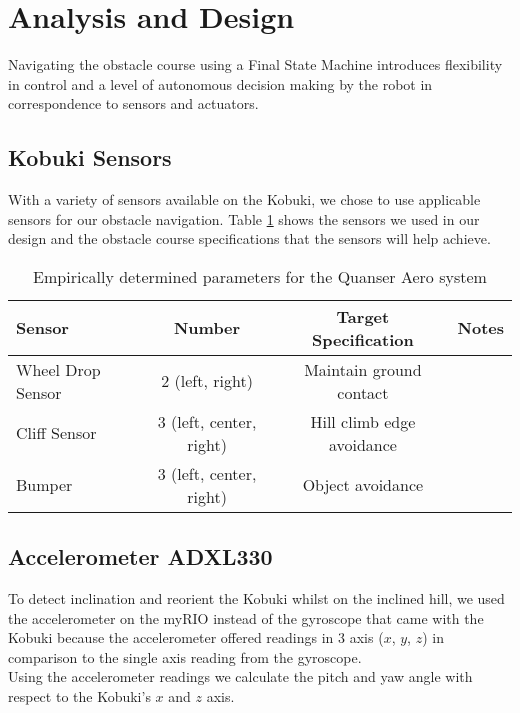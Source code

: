 \documentclass[11pt]{article}
\begin{document}
\section{Analysis and Design}
Navigating the obstacle course using a Final State Machine introduces flexibility in control and a level of autonomous decision making by the robot in correspondence to sensors and actuators.

\subsection{Kobuki Sensors}
With a variety of sensors available on the Kobuki, we chose to use applicable sensors for our obstacle navigation. Table \ref{table:kobuki_sensors} shows the sensors we used in our design and the obstacle course specifications that the sensors will help achieve.
\begin{table}[H]
\begin{center}
\begin{tabular}{ |l|c|c|c| } 
    \hline
    \textbf{Sensor} & \textbf{Number} & \textbf{Target Specification} & \textbf{Notes} \\ 
    \hline
    Wheel Drop Sensor & 2 (left, right) & Maintain ground contact & \\
    \hline
    Cliff Sensor & 3 (left, center, right) & Hill climb edge avoidance & \\
    \hline
    Bumper & 3 (left, center, right) & Object avoidance & \\
    \hline
\end{tabular}
\caption{Empirically determined parameters for the Quanser Aero system} \label{table:kobuki_sensors}
\end{center}
\end{table}

\subsection{Accelerometer ADXL330}
To detect inclination and reorient the Kobuki whilst on the inclined hill, we used the accelerometer on the myRIO instead of the gyroscope that came with the Kobuki because the accelerometer offered readings in 3 axis ($x$, $y$, $z$) in comparison to the single axis reading from the gyroscope.\\

\noindent Using the accelerometer readings we calculate the pitch and yaw angle with respect to the Kobuki's $x$ and $z$ axis. 
\end{document}
